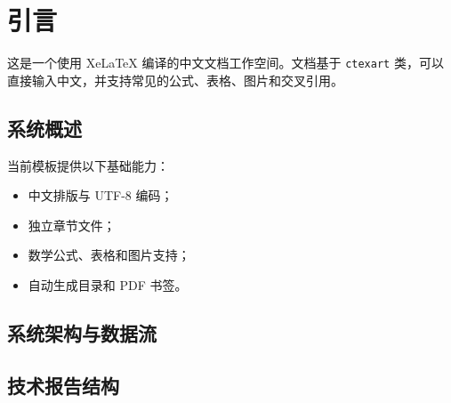 \section{引言}

这是一个使用 XeLaTeX 编译的中文文档工作空间。文档基于 \texttt{ctexart}
类，可以直接输入中文，并支持常见的公式、表格、图片和交叉引用。

\subsection{系统概述}

当前模板提供以下基础能力：

\begin{itemize}
  \item 中文排版与 UTF-8 编码；
  \item 独立章节文件；
  \item 数学公式、表格和图片支持；
  \item 自动生成目录和 PDF 书签。
\end{itemize}

\subsection{系统架构与数据流}

\subsection{技术报告结构}


